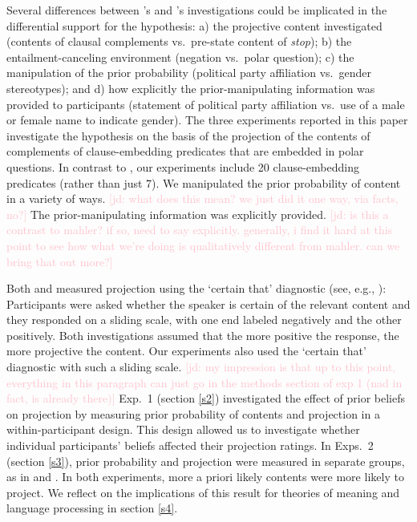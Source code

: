 \documentclass[11pt,fleqn]{article}
\newcommand{\jd}[1]{\textcolor{Pink}{[jd: #1]}}
\newcommand{\6}{\mbox{$[\hspace*{-.6mm}[$}}
\newcommand{\9}{\mbox{$]\hspace*{-.6mm}]$}}
\newcommand{\citeposs}[1]{\citeauthor{#1}'s}
\begin{document}
Several differences between \citeposs{mahler2020} and \citeposs{lorson2018} investigations could be implicated in the differential support for the hypothesis: a) the projective content investigated (contents of clausal complements vs.\ pre-state content of {\em stop}); b) the entailment-canceling environment (negation vs.\ polar question); c) the manipulation of the prior probability (political party affiliation vs.\ gender stereotypes); and d) how explicitly the prior-manipulating information was provided to participants (statement of political party affiliation vs.\  use of a male or female name to indicate gender). The three experiments reported in this paper investigate the hypothesis on the basis of the projection of the contents of complements of clause-embedding predicates that are embedded in polar questions. In contrast to , our experiments include 20 clause-embedding predicates (rather than just 7). %
We manipulated the prior probability of content in a variety of ways. \jd{what does this mean? we just did it one way, via facts, no?} The prior-manipulating information was explicitly provided. \jd{is this a contrast to mahler? if so, need to say explicitly. generally, i find it hard at this point to see how what we're doing is qualitatively different from mahler. can we bring that out more?}

Both  and  measured projection using the `certain that' diagnostic (see, e.g., ): Participants were asked whether the speaker is certain of the relevant content and they responded on a sliding scale, with one end  labeled negatively and the other positively. Both investigations assumed that the more positive the response, the more projective the content. Our experiments also used the `certain that' diagnostic with such a sliding scale. \jd{my impression is that up to this point, everything in this paragraph can just go in the methods section of exp 1 (nad in fact, is already there)} Exp.~1 (section \ref{s2}) investigated the effect of prior beliefs on projection %
by measuring prior probability of contents and projection in a within-participant design. This design allowed us to investigate whether individual participants' beliefs affected their projection ratings. In Exps.~2 (section \ref{s3}), prior probability and projection were measured in separate groups, as in  and . In both experiments, more a priori likely contents were more likely to project. We reflect on the implications of this result for theories of meaning and language processing in section \ref{s4}. 
\end{document}

